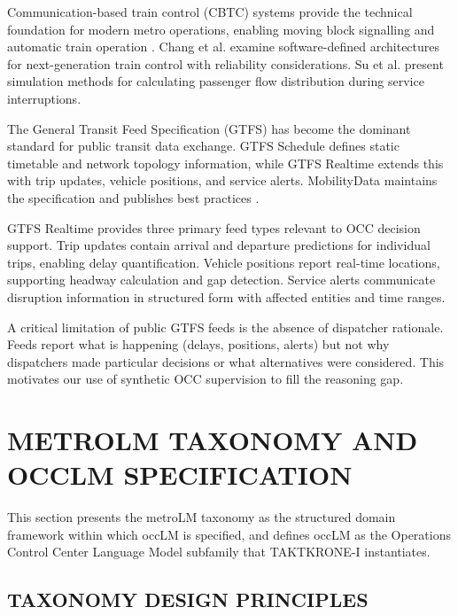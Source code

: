 \documentclass{IEEEoj}
\begin{document}
Communication-based train control (CBTC) systems provide the technical foundation for modern metro operations, enabling moving block signalling and automatic train operation \cite{li2016fuzzy, huang2021research}. Chang et al. \cite{chang2022architecture} examine software-defined architectures for next-generation train control with reliability considerations. Su et al. \cite{su2023simulation} present simulation methods for calculating passenger flow distribution during service interruptions.

The General Transit Feed Specification (GTFS) has become the dominant standard for public transit data exchange. GTFS Schedule \cite{gtfs_schedule} defines static timetable and network topology information, while GTFS Realtime \cite{gtfs_realtime} extends this with trip updates, vehicle positions, and service alerts. MobilityData \cite{mobilitydata} maintains the specification and publishes best practices \cite{gtfs_best_practices}.

GTFS Realtime provides three primary feed types relevant to OCC decision support. Trip updates \cite{gtfs_trip_updates} contain arrival and departure predictions for individual trips, enabling delay quantification. Vehicle positions \cite{gtfs_vehicle_positions} report real-time locations, supporting headway calculation and gap detection. Service alerts \cite{gtfs_service_alerts} communicate disruption information in structured form with affected entities and time ranges.

A critical limitation of public GTFS feeds is the absence of dispatcher rationale. Feeds report what is happening (delays, positions, alerts) but not why dispatchers made particular decisions or what alternatives were considered. This motivates our use of synthetic OCC supervision to fill the reasoning gap.

\section{METROLM TAXONOMY AND OCCLM SPECIFICATION}
\label{sec:taxonomy}

This section presents the metroLM taxonomy as the structured domain framework within which occLM is specified, and defines occLM as the Operations Control Center Language Model subfamily that TAKTKRONE-I instantiates.

\subsection{TAXONOMY DESIGN PRINCIPLES}
\end{document}

